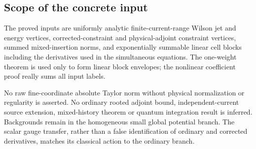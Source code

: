 \subsection{Scope of the concrete input}
\label{cv-scope}

The proved inputs are uniformly analytic finite-current-range
Wilson jet and energy vertices, corrected-constraint and
physical-adjoint constraint vertices, summed mixed-insertion
norms, and exponentially summable linear cell blocks including
the derivatives used in the simultaneous equations. The
one-weight theorem is used only to form linear block
envelopes; the nonlinear coefficient proof really sums all
input labels.

No raw fine-coordinate absolute Taylor norm without physical
normalization or regularity is asserted. No ordinary rooted
adjoint bound, independent-current source extension,
mixed-history theorem or quantum integration result is
inferred. Backgrounds remain in the homogeneous small global
potential branch. The scalar gauge transfer, rather than a
false identification of ordinary and corrected derivatives,
matches its classical action to the ordinary branch.
